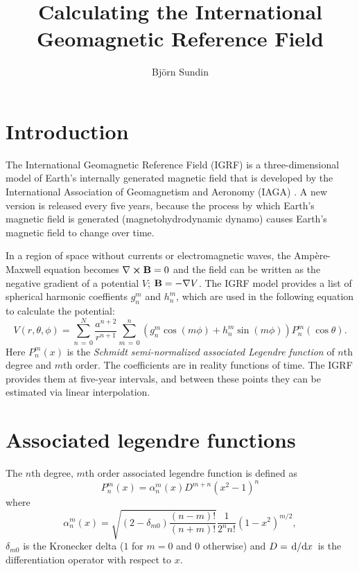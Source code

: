 \documentclass[12pt]{article}
\title{\vspace{-2.5em}Calculating the International Geomagnetic Reference Field}
\author{Björn Sundin}
\begin{document}
\maketitle

\section{Introduction}
The International Geomagnetic Reference Field (IGRF) is a three-dimensional model of Earth's internally generated magnetic field that is developed by the International Association of Geomagnetism and Aeronomy (IAGA) \parencite{Alken2021}. A new version is released every five years, because the process by which Earth's magnetic field is generated (magnetohydrodynamic dynamo) causes Earth's magnetic field to change over time.

In a region of space without currents or electromagnetic waves, the Ampère-Maxwell equation becomes $\nabla\crossproduct\vect{B} = 0$ and the field can be written as the negative gradient of a potential $V$; $\boldsymbol{\mathbf{B}} = -\nabla V$. The IGRF model provides a list of spherical harmonic coeffients $g_n^m$ and $h_n^m$, which are used in the following equation to calculate the potential:
\begin{equation}
  V(r, \theta, \phi) = \sum_{n\,=\,0}^N\frac{a^{n+2}}{r^{n+1}}\sum_{m\,=\,0}^n\left(g_n^m\cos(m\phi) + h_n^m\sin(m\phi)\right)P_n^m(\cos\theta).
\end{equation}
Here $P_n^m(x)$ is the \textit{Schmidt semi-normalized associated Legendre function} of $n$th degree and $m$th order. The coefficients are in reality functions of time. The IGRF provides them at five-year intervals, and between these points they can be estimated via linear interpolation.

\section{Associated legendre functions}

The $n$th degree, $m$th order associated legendre function is defined as
\begin{equation}
  P_n^m(x) = \alpha_n^m(x)D^{m+n}(x^2-1)^n
\end{equation}
where
\begin{equation}
  \alpha_n^m(x) = \sqrt{(2-\delta_{m0})\frac{(n-m)!}{(n+m)!}}\frac{1}{2^nn!}(1-x^2)^{m/2},
\end{equation}
$\delta_{m0}$ is the Kronecker delta ($1$ for $m=0$ and $0$ otherwise) and $D = \derivative*{x}$ is the differentiation operator with respect to $x$.
\end{document}
